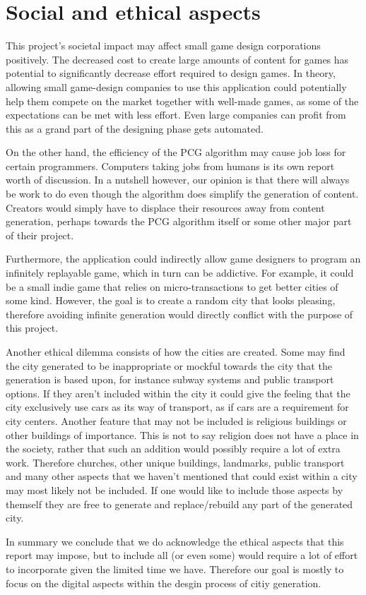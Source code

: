 \section{Social and ethical aspects}
This project's societal impact may affect small game design corporations positively.
The decreased cost to create large amounts of content for games has potential to significantly decrease effort required to design games.
In theory, allowing small game-design companies to use this application could potentially help them compete on the market together with well-made games, as some of the expectations can be met with less effort.
Even large companies can profit from this as a grand part of the designing phase gets automated.

On the other hand, the efficiency of the PCG algorithm may cause job loss for certain programmers.
Computers taking jobs from humans is its own report worth of discussion.
In a nutshell however, our opinion is that there will always be work to do even though the algorithm does simplify the generation of content.
Creators would simply have to displace their resources away from content generation, perhaps towards the PCG algorithm itself or some other major part of their project.

Furthermore, the application could indirectly allow game designers to program an infinitely replayable game, which in turn can be addictive.
For example, it could be a small indie game that relies on micro-transactions to get better cities of some kind.
However, the goal is to create a random city that looks pleasing, therefore avoiding infinite generation would directly conflict with the purpose of this project.

Another ethical dilemma consists of how the cities are created.
Some may find the city generated to be inappropriate or mockful towards the city that the generation is based upon,
for instance subway systems and public transport options. If they aren't included within the city it could give the feeling that the city exclusively use cars as its way of transport, as if cars are a requirement for city centers.
Another feature that may not be included is religious buildings or other buildings of importance.
This is not to say religion does not have a place in the society, rather that such an addition would possibly require a lot of extra work.
Therefore churches, other unique buildings, landmarks, public transport and many other aspects that we haven't mentioned that could exist within a city may most likely not be included.
If one would like to include those aspects by themself they are free to generate and replace/rebuild any part of the generated city.

In summary we conclude that we do acknowledge the ethical aspects that this report may impose, but to include all (or even some) would require a lot of effort to incorporate given the limited time we have. Therefore our goal is mostly to focus on the digital aspects within the desgin process of citiy generation. 